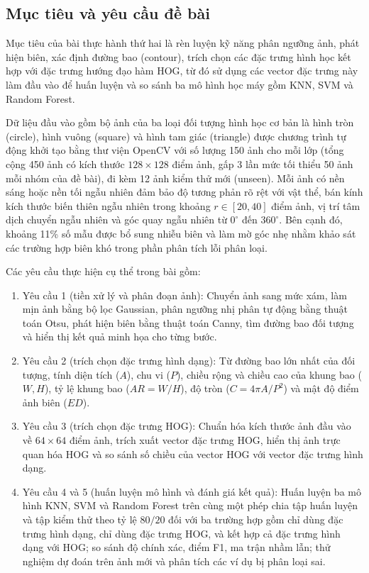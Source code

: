 \documentclass[12pt,a4paper]{article}
\begin{document}
\subsection{Mục tiêu và yêu cầu đề bài}
Mục tiêu của bài thực hành thứ hai là rèn luyện kỹ năng phân ngưỡng ảnh, phát hiện biên, xác định đường bao (contour), trích chọn các đặc trưng hình học kết hợp với đặc trưng hướng đạo hàm HOG, từ đó sử dụng các vector đặc trưng này làm đầu vào để huấn luyện và so sánh ba mô hình học máy gồm KNN, SVM và Random Forest.

Dữ liệu đầu vào gồm bộ ảnh của ba loại đối tượng hình học cơ bản là hình tròn (circle), hình vuông (square) và hình tam giác (triangle) được chương trình tự động khởi tạo bằng thư viện OpenCV với số lượng 150 ảnh cho mỗi lớp (tổng cộng 450 ảnh có kích thước $128 \times 128$ điểm ảnh, gấp 3 lần mức tối thiểu 50 ảnh mỗi nhóm của đề bài), đi kèm 12 ảnh kiểm thử mới (unseen). Mỗi ảnh có nền sáng hoặc nền tối ngẫu nhiên đảm bảo độ tương phản rõ rệt với vật thể, bán kính kích thước biến thiên ngẫu nhiên trong khoảng $r \in [20, 40]$ điểm ảnh, vị trí tâm dịch chuyển ngẫu nhiên và góc quay ngẫu nhiên từ $0^\circ$ đến $360^\circ$. Bên cạnh đó, khoảng 11\% số mẫu được bổ sung nhiễu biên và làm mờ góc nhẹ nhằm khảo sát các trường hợp biên khó trong phần phân tích lỗi phân loại.

Các yêu cầu thực hiện cụ thể trong bài gồm:
\begin{enumerate}
    \item Yêu cầu 1 (tiền xử lý và phân đoạn ảnh): Chuyển ảnh sang mức xám, làm mịn ảnh bằng bộ lọc Gaussian, phân ngưỡng nhị phân tự động bằng thuật toán Otsu, phát hiện biên bằng thuật toán Canny, tìm đường bao đối tượng và hiển thị kết quả minh họa cho từng bước.
    \item Yêu cầu 2 (trích chọn đặc trưng hình dạng): Từ đường bao lớn nhất của đối tượng, tính diện tích ($A$), chu vi ($P$), chiều rộng và chiều cao của khung bao ($W, H$), tỷ lệ khung bao ($AR = W/H$), độ tròn ($C = 4\pi A/P^2$) và mật độ điểm ảnh biên ($ED$).
    \item Yêu cầu 3 (trích chọn đặc trưng HOG): Chuẩn hóa kích thước ảnh đầu vào về $64 \times 64$ điểm ảnh, trích xuất vector đặc trưng HOG, hiển thị ảnh trực quan hóa HOG và so sánh số chiều của vector HOG với vector đặc trưng hình dạng.
    \item Yêu cầu 4 và 5 (huấn luyện mô hình và đánh giá kết quả): Huấn luyện ba mô hình KNN, SVM và Random Forest trên cùng một phép chia tập huấn luyện và tập kiểm thử theo tỷ lệ $80/20$ đối với ba trường hợp gồm chỉ dùng đặc trưng hình dạng, chỉ dùng đặc trưng HOG, và kết hợp cả đặc trưng hình dạng với HOG; so sánh độ chính xác, điểm F1, ma trận nhầm lẫn; thử nghiệm dự đoán trên ảnh mới và phân tích các ví dụ bị phân loại sai.
\end{enumerate}
\end{document}
